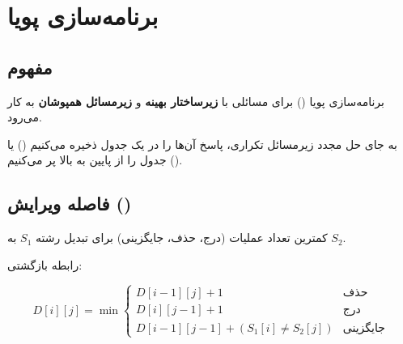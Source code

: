 \documentclass{matinbook}
\begin{document}
    \section{برنامه‌سازی پویا}
    
    \subsection{مفهوم}
    
    برنامه‌سازی پویا
    () برای مسائلی
    با \textbf{زیرساختار بهینه} و
    \textbf{زیرمسائل همپوشان} به کار می‌رود.
    
    \begin{definition}
        به جای حل مجدد زیرمسائل تکراری،
        پاسخ آن‌ها را در یک جدول ذخیره می‌کنیم
        () یا جدول را از پایین
        به بالا پر می‌کنیم ().
        \label{def:dp}
    \end{definition}
    
    \subsection{فاصله ویرایش ()}
    
    \begin{definition}
        کمترین تعداد عملیات (درج، حذف، جایگزینی)
        برای تبدیل رشته $S_{1}$ به $S_{2}$.
        \label{def:edit-distance}
    \end{definition}
    
    رابطه بازگشتی:
    
    \[
    D[i][j] = \min \begin{cases}
        D[i-1][j] + 1 & \text{حذف} \\
        D[i][j-1] + 1 & \text{درج} \\
        D[i-1][j-1] + (S_{1}[i] \neq S_{2}[j]) & \text{جایگزینی}
    \end{cases}
    \]
    
\end{document}
